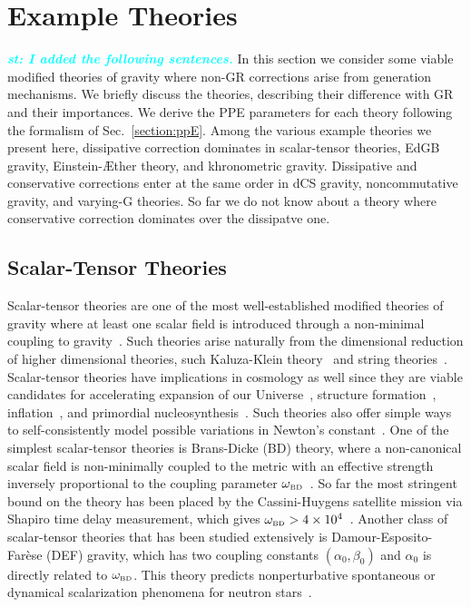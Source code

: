\documentclass[prd,twocolumn,nofootinbib]{revtex4-1}
\newcommand{\BD}{{\mbox{\tiny BD}}}
\newcommand{\st}[1]{\textcolor{cyan}{\it{\textbf{st: #1}}} }
\begin{document}
 \section{Example Theories}
\st{I added the following sentences.}
In this section we consider some viable modified theories of gravity where non-GR corrections arise from generation mechanisms. We briefly discuss the theories, describing their difference with GR and their importances. We derive the PPE parameters for each theory following the formalism of Sec.~\ref{section:ppE}. Among the various example theories we present here, dissipative correction dominates in scalar-tensor theories, EdGB gravity, Einstein-\AE ther theory, and khronometric gravity. Dissipative and conservative corrections enter at the same order in dCS gravity, noncommutative gravity, and varying-G theories. So far we do not know about a theory where conservative correction dominates over the dissipatve one.

 \subsection{Scalar-Tensor Theories}
Scalar-tensor theories are one of the most well-established modified theories of gravity where at least one scalar field is introduced through a non-minimal coupling to gravity~\cite{Berti:2015itd,Chiba:1997ms,PhysRevD.6.2077}. Such theories arise naturally from the dimensional reduction of higher dimensional theories, such Kaluza-Klein theory~\cite{Fujii:2003pa,Overduin:1998pn} and string theories~\cite{polchinski1,polchinski2}.
Scalar-tensor theories have implications in cosmology as well since they are viable candidates for accelerating expansion of our Universe~\cite{Brax:2004qh,PhysRevD.73.083510,PhysRevD.62.123510,PhysRevD.66.023525,Schimd:2004nq}, structure formation~\cite{Brax:2005ew}, inflation~\cite{Burd:1991ns,Barrow:1990nv,Banerjee:1993ct,Clifton:2011jh}, and primordial nucleosynthesis~\cite{Coc:2006rt,Damour:1998ae,Larena:2005tu,Torres:1995je}. Such theories also offer simple ways to self-consistently model possible variations in Newton's constant~\cite{Clifton:2011jh}. One of the simplest scalar-tensor theories is Brans-Dicke (BD) theory, where a non-canonical scalar field is non-minimally coupled to the metric with an effective strength inversely proportional to the coupling parameter $\omega_{\BD}$~\cite{PhysRev.124.925,Scharre:2001hn}. So far the most stringent bound on the theory has been placed by the Cassini-Huygens satellite mission via Shapiro time delay measurement, which gives $\omega_{\BD}>4\times10^4$~\cite{Bertotti:2003rm}. Another class of scalar-tensor theories that has been studied extensively is Damour-Esposito-Far\`ese (DEF) gravity, which has two coupling constants $(\alpha_0,\beta_0)$ and $\alpha_0$ is directly related to $\omega_\BD$. This theory predicts nonperturbative spontaneous or dynamical scalarization phenomena for neutron stars~\cite{PhysRevLett.70.2220,Barausse:2012da}. 
\end{document}
